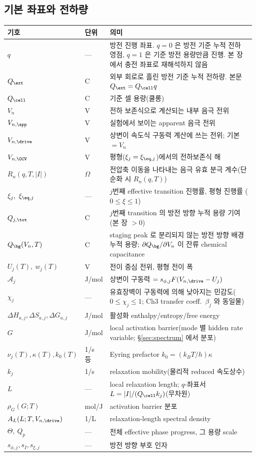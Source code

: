 \subsection{기본 좌표와 전하량}
\begin{longtable}{p{} p{} p{}}
\toprule 기호 & 단위 & 의미 \\ \midrule \endhead
$q$ & --- & 방전 진행 좌표. $q=0$ 은 방전 기준 누적 전하 영점, $q=1$ 은 기준 방전 용량만큼 진행. 본 장에서 충전 좌표로 재해석하지 않음 \\
$Q_\ext$ & C & 외부 회로로 흘린 방전 기준 누적 전하량. 본문 $Q_\ext=Q_\cell q$ \\
$Q_\cell$ & C & 기준 셀 용량(쿨롱) \\
$V_n$ & V & 전하 보존식으로 계산되는 내부 음극 전위 \\
$V_{n,\app}$ & V & 실험에서 보이는 apparent 음극 전위 \\
$V_{n,\drive}$ & V & 상변이 속도식 구동력 계산에 쓰는 전위; 기본 $=V_n$ \\
$V_{n,\OCV}$ & V & 평형($\xi_j=\xi_{\eq,j}$)에서의 전하보존식 해 \\
$R_n(q,T,|I|)$ & $\Omega$ & 전압축 이동을 나타내는 음극 유효 분극 계수(단순화 시 $R_n(q,T)$) \\
$\xi_j,\ \xi_{\eq,j}$ & --- & $j$번째 effective transition 진행률, 평형 진행률 ($0\!\le\!\xi\!\le\!1$) \\
$Q_{j,\tot}$ & C & $j$번째 transition 의 방전 방향 누적 용량 기여(본 장 $>0$) \\
$Q_\bg(V_n,T)$ & C & staging peak 로 분리되지 않는 방전 방향 배경 누적 용량; $\partial Q_\bg/\partial V_n$ 이 잔류 chemical capacitance \\
$U_j(T),\ w_j(T)$ & V & 전이 중심 전위, 평형 전이 폭 \\
$\mathcal A_j$ & J/mol & 상변이 구동력 $=s_{\phi,j}F(V_{n,\drive}-U_j)$ \\
$\chi_j$ & --- & 유효장벽이 구동력에 의해 낮아지는 민감도($0\le\chi_j\le1$; Ch3 transfer coeff.\ $\beta_j$ 와 동일물) \\
$\Delta H_{a,j},\Delta S_{a,j},\Delta G_{a,j}$ & J/mol & 활성화 enthalpy/entropy/free energy \\
$G$ & J/mol & local activation barrier(mode 별 hidden rate variable; \S\ref{sec:spectrum} 에서 분포) \\
$\nu_j(T),\kappa(T),k_0(T)$ & 1/s 등 & Eyring prefactor $k_0=(k_BT/h)\kappa$ \\
$k_j$ & 1/s & relaxation mobility(물리적 reduced 속도상수) \\
$L$ & --- & local relaxation length; $q$-좌표서 $L=|I|/(Q_\cell k_j)$(무차원) \\
$\rho_G(G;T)$ & mol/J & activation barrier 분포 \\
$A_L(L;T,V_{n,\drive})$ & 1/L & relaxation-length spectral density \\
$\Theta,\ Q_p$ & --- & 전체 effective phase progress, 그 용량 scale \\
$s_{\phi,j},s_I,s_{\xi,j}$ & --- & 방전 방향 부호 인자 \\
\bottomrule
\end{longtable}

